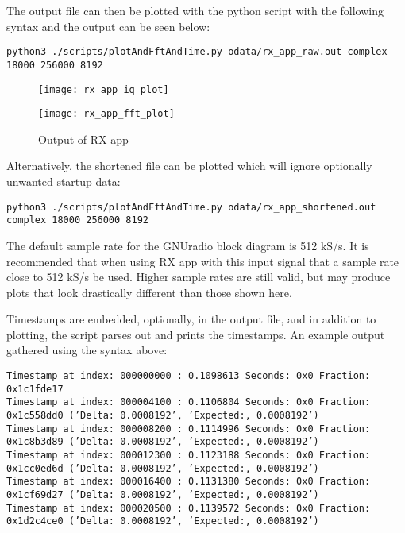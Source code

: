 \par\medskip
\noindent The output file can then be plotted with the python script with the following syntax and the output can be seen below:\par\medskip
\noindent\texttt{python3 ./scripts/plotAndFftAndTime.py odata/rx\_app\_raw.out complex 18000 256000 8192}\par
	\begin{figure}[h]
	 	\centering
		\texttt{[image: rx\_app\_iq\_plot]}
		\label{fig:rx_app_iq_plot}
	\end{figure}
	\begin{figure}[h]
	 	\centering
		\texttt{[image: rx\_app\_fft\_plot]}
		\caption{Output of RX app}
		\label{fig:rx_app_fft_plot}
	\end{figure}
\noindent Alternatively, the shortened file can be plotted which will ignore optionally unwanted startup data:\par\medskip
\noindent\texttt{python3 ./scripts/plotAndFftAndTime.py odata/rx\_app\_shortened.out complex 18000 256000 8192}\par\medskip
\noindent The default sample rate for the GNUradio block diagram is 512 kS/s. It is recommended that when using RX app with this input signal that a sample rate close to 512 kS/s be used. Higher sample rates are still valid, but may produce plots that look drastically different than those shown here.\par\medskip
\newpage
\noindent Timestamps are embedded, optionally, in the output file, and in addition to plotting, the script parses out and prints the timestamps. An example output gathered using the syntax above:\par\medskip
\scriptsize\noindent\texttt{Timestamp at index: 000000000 :  0.1098613 Seconds: 0x0 Fraction: 0x1c1fde17 \\ 
Timestamp at index: 000004100 :  0.1106804 Seconds: 0x0 Fraction: 0x1c558dd0 ('Delta: 0.0008192', 'Expected:, 0.0008192') \\
Timestamp at index: 000008200 :  0.1114996 Seconds: 0x0 Fraction: 0x1c8b3d89 ('Delta: 0.0008192', 'Expected:, 0.0008192') \\
Timestamp at index: 000012300 :  0.1123188 Seconds: 0x0 Fraction: 0x1cc0ed6d ('Delta: 0.0008192', 'Expected:, 0.0008192') \\
Timestamp at index: 000016400 :  0.1131380 Seconds: 0x0 Fraction: 0x1cf69d27 ('Delta: 0.0008192', 'Expected:, 0.0008192') \\
Timestamp at index: 000020500 :  0.1139572 Seconds: 0x0 Fraction: 0x1d2c4ce0 ('Delta: 0.0008192', 'Expected:, 0.0008192')}\par\medskip


